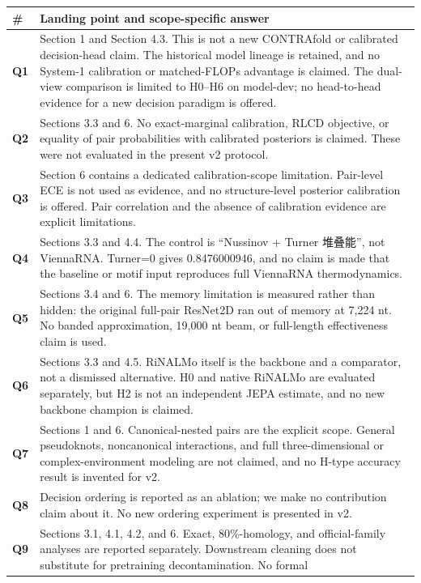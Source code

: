 \documentclass[
  11pt]{article}
\begin{document}
\begin{longtable}[]{@{}ll@{}}
\toprule
\# & Landing point and scope-specific answer \\
\midrule
\endhead
\textbf{Q1} & Section 1 and Section 4.3. This is not a new CONTRAfold or
calibrated decision-head claim. The historical model lineage is
retained, and no System-1 calibration or matched-FLOPs advantage is
claimed. The dual-view comparison is limited to H0--H6 on model-dev; no
head-to-head evidence for a new decision paradigm is offered. \\
\textbf{Q2} & Sections 3.3 and 6. No exact-marginal calibration, RLCD
objective, or equality of pair probabilities with calibrated posteriors
is claimed. These were not evaluated in the present v2 protocol. \\
\textbf{Q3} & Section 6 contains a dedicated calibration-scope
limitation. Pair-level ECE is not used as evidence, and no
structure-level posterior calibration is offered. Pair correlation and
the absence of calibration evidence are explicit limitations. \\
\textbf{Q4} & Sections 3.3 and 4.4. The control is ``Nussinov + Turner
堆叠能'', not ViennaRNA. Turner=0 gives 0.8476000946, and no claim is
made that the baseline or motif input reproduces full ViennaRNA
thermodynamics. \\
\textbf{Q5} & Sections 3.4 and 6. The memory limitation is measured
rather than hidden: the original full-pair ResNet2D ran out of memory at
7,224 nt. No banded approximation, 19,000 nt beam, or full-length
effectiveness claim is used. \\
\textbf{Q6} & Sections 3.3 and 4.5. RiNALMo itself is the backbone and a
comparator, not a dismissed alternative. H0 and native RiNALMo are
evaluated separately, but H2 is not an independent JEPA estimate, and no
new backbone champion is claimed. \\
\textbf{Q7} & Sections 1 and 6. Canonical-nested pairs are the explicit
scope. General pseudoknots, noncanonical interactions, and full
three-dimensional or complex-environment modeling are not claimed, and
no H-type accuracy result is invented for v2. \\
\textbf{Q8} & Decision ordering is reported as an ablation; we make no
contribution claim about it. No new ordering experiment is presented in
v2. \\
\textbf{Q9} & Sections 3.1, 4.1, 4.2, and 6. Exact, 80\%-homology, and
official-family analyses are reported separately. Downstream cleaning
does not substitute for pretraining decontamination. No formal

\end{longtable}
\end{document}

